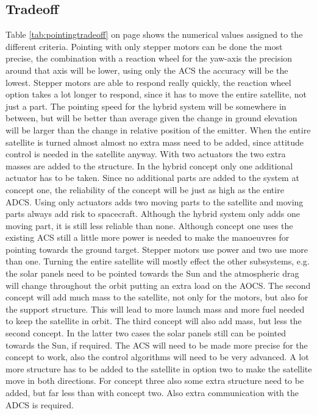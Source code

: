 \subsection{Tradeoff}
Table \ref{tab:pointingtradeoff} on page \pageref{tab:pointingtradeoff} shows the numerical values assigned to the different criteria. 
Pointing with only stepper motors can be done the most precise, the combination with a reaction wheel for the yaw-axis the precision around that axis will be lower, using only the \ac{ACS} the accuracy will be the lowest. 
Stepper motors are able to respond really quickly, the reaction wheel option takes a lot longer to respond, since it has to move the entire satellite, not just a part. The pointing speed for the hybrid system will be somewhere in between, but will be better than average given the change in ground elevation will be larger than the change in relative position of the emitter.
When the entire satellite is turned almost almost no extra mass need to be added, since attitude control is needed in the satellite anyway. With two actuators the two extra masses are added to the structure. In the hybrid concept only one additional actuator has to be taken.
Since no additional parts are added to the system at concept one, the reliability of the concept will be just as high as the entire \ac{ADCS}. Using only actuators adds two moving parts to the satellite and moving parts always add risk to spacecraft. Although the hybrid system only adds one moving part, it is still less reliable than none.
Although concept one uses the existing \ac{ACS} still a little more power is needed to make the manoeuvres for pointing towards the ground target. Stepper motors use power and two use more than one.
Turning the entire satellite will mostly effect the other subsystems, e.g. the solar panels need to be pointed towards the Sun and the atmospheric drag will change throughout the orbit putting an extra load on the \ac{AOCS}. The second concept will add much mass to the satellite, not only for the motors, but also for the support structure. This will lead to more launch mass and more fuel needed to keep the satellite in orbit. The third concept will also add mass, but less the second concept. In the latter two cases the solar panels still can be pointed towards the Sun, if required.
The \ac{ACS} will need to be made more precise for the concept to work, also the control algorithms will need to be very advanced. A lot more structure has to be added to the satellite in option two to make the satellite move in both directions. For concept three also some extra structure need to be added, but far less than with concept two. Also extra communication with the \ac{ADCS} is required.

